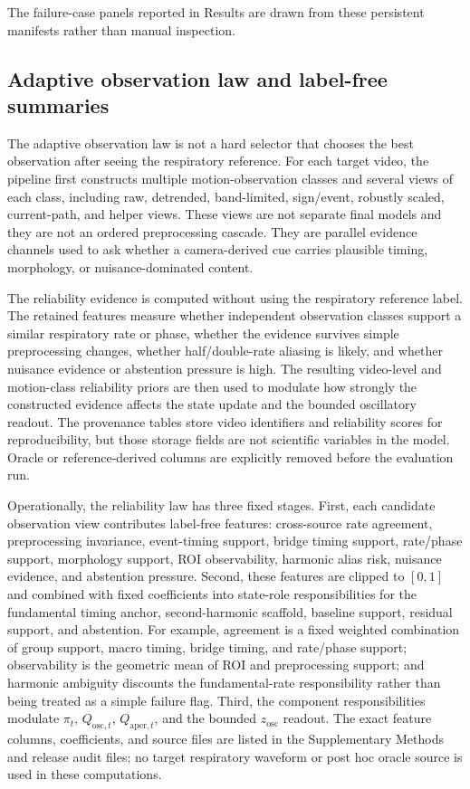 \documentclass[fleqn,10pt]{wlscirep}
\begin{document}
The failure-case panels reported in Results are drawn from these persistent
manifests rather than manual inspection.

\subsection*{Adaptive observation law and label-free summaries}
The adaptive observation law is not a hard selector that chooses the best
observation after seeing the respiratory reference. For each target video, the
pipeline first constructs multiple motion-observation classes and several
views of each class, including raw, detrended, band-limited, sign/event,
robustly scaled, current-path, and helper views. These views are not separate
final models and they are not an ordered preprocessing cascade. They are
parallel evidence channels used to ask whether a camera-derived cue carries
plausible timing, morphology, or nuisance-dominated content.

The reliability evidence is computed without using the respiratory reference
label. The retained features measure whether independent
observation classes support a similar respiratory rate or phase, whether the evidence survives
simple preprocessing changes, whether half/double-rate aliasing is likely, and
whether nuisance evidence or abstention pressure is high. The resulting video-level and
motion-class reliability priors are then used to modulate how strongly the
constructed evidence affects the state update and the bounded oscillatory readout.
The provenance tables store video identifiers and reliability scores for
reproducibility, but those storage fields are not scientific variables in the
model. Oracle or reference-derived columns are explicitly removed before the
evaluation run.

Operationally, the reliability law has three fixed stages. First, each
candidate observation view contributes label-free features: cross-source
rate agreement, preprocessing invariance, event-timing support, bridge timing
support, rate/phase support, morphology support, ROI observability, harmonic
alias risk, nuisance evidence, and abstention pressure. Second, these features
are clipped to $[0,1]$ and combined with fixed coefficients into state-role
responsibilities for the fundamental timing anchor, second-harmonic scaffold,
baseline support, residual support, and abstention. For example, agreement is a
fixed weighted combination of group support, macro timing, bridge timing, and
rate/phase support; observability is the geometric mean of ROI and preprocessing
support; and harmonic ambiguity discounts the fundamental-rate responsibility
rather than being treated as a simple failure flag. Third, the component
responsibilities modulate $\pi_t$, $Q_{\mathrm{osc},t}$,
$Q_{\mathrm{aper},t}$, and the bounded $z_{\mathrm{osc}}$ readout. The exact
feature columns, coefficients, and source files are listed in the Supplementary
Methods and release audit files; no target respiratory waveform or
post hoc oracle source is used in these computations.
\end{document}

